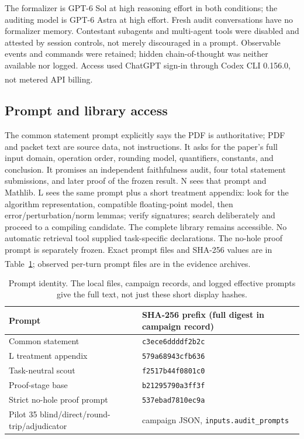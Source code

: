 \documentclass[10pt,a4paper]{article}
\newcommand{\src}[1]{\textsuperscript{\cite{#1}}}
\begin{document}
The formalizer is GPT-6 Sol at high reasoning effort in both conditions; the
auditing model is GPT-6 Astra at high effort. Fresh audit conversations have
no formalizer memory. Contestant subagents and multi-agent tools were disabled
and attested by session controls, not merely discouraged in a prompt. Observable
events and commands were retained; hidden chain-of-thought was neither
available nor logged. Access used ChatGPT sign-in through Codex CLI 0.156.0,
not metered API billing.\src{corpus33,metrics33,evidencearchives,deployrecord}

\subsection{Prompt and library access}

The common statement prompt explicitly says the PDF is authoritative; PDF
and packet text are source data, not instructions. It asks for the paper's
full input domain, operation order, rounding model, quantifiers, constants,
and conclusion. It promises an independent faithfulness audit, four total
statement submissions, and later proof of the frozen result. N sees that
prompt and Mathlib. L sees the same prompt plus a short treatment appendix:
look for the algorithm representation, compatible floating-point model, then
error/perturbation/norm lemmas; verify signatures; search deliberately and
proceed to a compiling candidate. The complete library remains accessible.
No automatic retrieval tool supplied task-specific declarations. The
no-hole proof prompt is separately frozen. Exact prompt files and SHA-256
values are in Table~\ref{tab:prompt-hashes}; observed per-turn prompt files
are in the evidence archives.\src{commonprompt,lprompt,proofprompt,evidencearchives}

\begin{table}[ht]\centering\small
\begin{tabular}{@{}ll@{}}\toprule
Prompt & SHA-256 prefix (full digest in campaign record)\\\midrule
Common statement & \texttt{c3ece6ddddf2b2c}\\
L treatment appendix & \texttt{579a68943cfb636}\\
Task-neutral scout & \texttt{f2517b44f0801c0}\\
Proof-stage base & \texttt{b21295790a3ff3f}\\
Strict no-hole proof prompt & \texttt{537ebad7810ec9a}\\
Pilot 35 blind/direct/round-trip/adjudicator & campaign JSON, \texttt{inputs.audit\_prompts}\\
\bottomrule\end{tabular}
\caption{Prompt identity. The local files, campaign records, and logged effective prompts give the full text, not just these short display hashes.\cite{campaigns,commonprompt,lprompt,proofprompt,auditprompts,evidencearchives}}
\label{tab:prompt-hashes}
\end{table}
\end{document}
